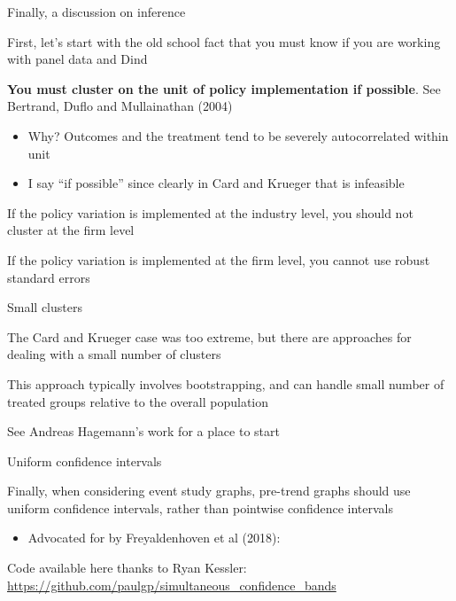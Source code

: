 \documentclass[notes,11pt, aspectratio=169]{beamer}
\newenvironment{wideitemize}{\itemize\addtolength{\itemsep}{10pt}}{\enditemize}
\begin{document}
\begin{frame}{Finally, a discussion on inference}
  \begin{wideitemize}
  \item First, let's start with the old school fact that you must know
    if you are working with panel data and Dind
  \item \textbf{You must cluster on the unit of policy implementation
      if possible}. See Bertrand, Duflo and Mullainathan (2004)
    \begin{itemize}
    \item Why? Outcomes and the treatment tend to be severely
      autocorrelated within unit
    \item I say ``if possible'' since clearly in Card and Krueger that
      is infeasible
    \end{itemize}
  \item If the policy variation is implemented at the industry level,
    you should not cluster at the firm level
  \item If the policy variation is implemented at the firm level, you
    cannot use robust standard errors
  \end{wideitemize}
\end{frame}

\begin{frame}{Small clusters}
  \begin{wideitemize}
  \item The Card and Krueger case was too extreme, but there are approaches for dealing with a small number of clusters
  \item This approach typically involves  bootstrapping, and can handle small number of treated groups relative to the overall population
  \item See Andreas Hagemann's work for a place to start
  \end{wideitemize}
\end{frame}

\begin{frame}{Uniform confidence intervals}
  \begin{wideitemize}
  \item Finally, when considering event study graphs, pre-trend graphs
    should use uniform confidence intervals, rather than pointwise confidence intervals
    \begin{itemize}
    \item Advocated for by Freyaldenhoven et al (2018):
    \end{itemize}
  \item Code available here thanks to Ryan Kessler: \url{https://github.com/paulgp/simultaneous_confidence_bands}
    \begin{center}
    \end{center}
  \end{wideitemize}
\end{frame}
\end{document}
